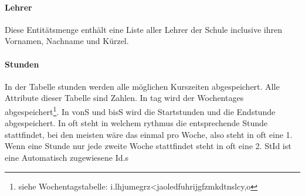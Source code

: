 \documentclass[a4paper, 12pt]{article}
\theoremstyle{plain}
\theoremstyle{definition}
\begin{document}
\paragraph{Lehrer}
\label{sec:Tablehrer}
Diese Entitätsmenge enthält eine Liste aller Lehrer der Schule inclusive ihren Vornamen, Nachname und Kürzel.
\paragraph{Stunden}
In der Tabelle stunden werden alle möglichen Kurszeiten abgespeichert. Alle Attribute dieser Tabelle sind Zahlen. In tag wird der Wochentages abgespeichert\footnote{siehe Wochentagstabelle: i.lhjumegrz<jaoledfuhrijgfzmkdtnslcy,o}. In vonS und bisS wird die Startstunden und die Endstunde abgespeichert. In oft steht in welchem rythmus die entsprechende Stunde stattfindet, bei den meisten wäre das einmal pro Woche, also steht in oft eine 1. Wenn eine Stunde nur jede zweite Woche stattfindet steht in oft eine 2. StId ist eine Automatisch zugewiesene Id.s
\end{document}
